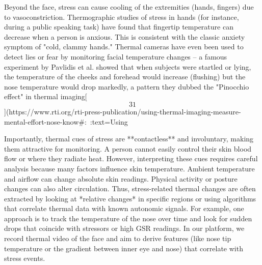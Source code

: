 \documentclass[12pt,a4paper]{article}
\begin{document}
Beyond the face, stress can cause cooling of the extremities (hands,
fingers) due to vasoconstriction. Thermographic studies of stress in
hands (for instance, during a public speaking task) have found that
fingertip temperature can decrease when a person is anxious. This is
consistent with the classic anxiety symptom of "cold, clammy hands."
Thermal cameras have even been used to detect lies or fear by monitoring
facial temperature changes -- a famous experiment by Pavlidis et al.
showed that when subjects were startled or lying, the temperature of the
cheeks and forehead would increase (flushing) but the nose temperature
would drop markedly, a pattern they dubbed the "Pinocchio effect" in
thermal
imaging[\[31\]](https://www.rti.org/rti-press-publication/using-thermal-imaging-measure-mental-effort-nose-know#:~:text=Using%

Importantly, thermal cues of stress are **contactless** and involuntary,
making them attractive for monitoring. A person cannot easily control
their skin blood flow or where they radiate heat. However, interpreting
these cues requires careful analysis because many factors influence skin
temperature. Ambient temperature and airflow can change absolute skin
readings. Physical activity or posture changes can also alter
circulation. Thus, stress-related thermal changes are often extracted by
looking at *relative changes* in specific regions or using algorithms
that correlate thermal data with known autonomic signals. For example,
one approach is to track the temperature of the nose over time and look
for sudden drops that coincide with stressors or high GSR readings. In
our platform, we record thermal video of the face and aim to derive
features (like nose tip temperature or the gradient between inner eye
and nose) that correlate with stress events.
\end{document}
